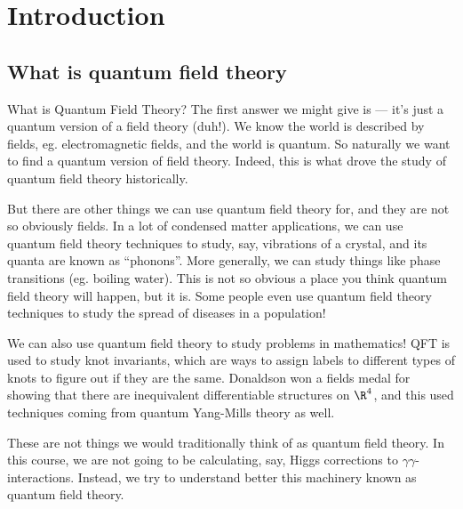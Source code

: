 \documentclass[a4paper]{article}
\begin{document}
\tableofcontents

\setcounter{section}{-1}
\section{Introduction}
\subsection{What is quantum field theory}
What is Quantum Field Theory? The first answer we might give is --- it's just a quantum version of a field theory (duh!). We know the world is described by fields, eg. electromagnetic fields, and the world is quantum. So naturally we want to find a quantum version of field theory. Indeed, this is what drove the study of quantum field theory historically.

But there are other things we can use quantum field theory for, and they are not so obviously fields. In a lot of condensed matter applications, we can use quantum field theory techniques to study, say, vibrations of a crystal, and its quanta are known as ``phonons''. More generally, we can study things like phase transitions (eg. boiling water). This is not so obvious a place you think quantum field theory will happen, but it is. Some people even use quantum field theory techniques to study the spread of diseases in a population!

We can also use quantum field theory to study problems in mathematics! QFT is used to study knot invariants, which are ways to assign labels to different types of knots to figure out if they are the same. Donaldson won a fields medal for showing that there are inequivalent differentiable structures on $\R^4$, and this used techniques coming from quantum Yang-Mills theory as well.

These are not things we would traditionally think of as quantum field theory. In this course, we are not going to be calculating, say, Higgs corrections to $\gamma\gamma$-interactions. Instead, we try to understand better this machinery known as quantum field theory.
\end{document}
